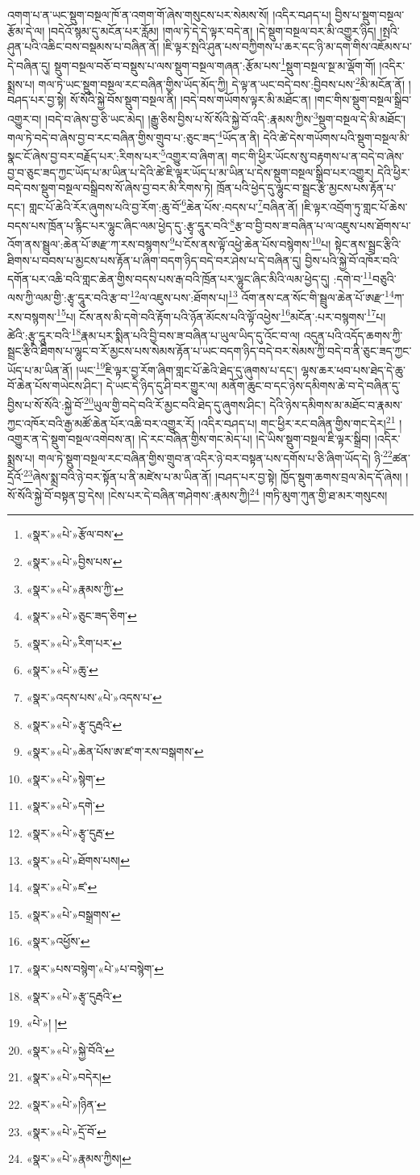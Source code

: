 འགག་པ་ན་ཡང་སྡུག་བསྔལ་ཁོ་ན་འགག་གོ་ཞེས་གསུངས་པར་སེམས་སོ། །འདིར་བཤད་པ། བྱིས་པ་སྡུག་བསྔལ་རྩོམ་དེ་ལ། །བདེའོ་སྙམ་དུ་མངོན་པར་རློམ། །གལ་ཏེ་དེ་དེ་ལྟར་བདེ་ན། །དེ་སྡུག་བསྔལ་བར་མི་འགྱུར་ཉིད། །སྤའི་ཤུན་པའི་འཆིང་བས་བསྡམས་པ་བཞིན་ནོ། །ཇི་ལྟར་སྤའི་ཤུན་པས་བཀྱིགས་པ་ཆར་དང་ཉི་མ་དག་གིས་འཇོམས་པ་དེ་བཞིན་དུ། སྡུག་བསྔལ་བཅོ་བ་བསྡུས་པ་ལས་སྡུག་བསྔལ་གཞན་:རྩོམ་པས་\footnote{«སྣར་»«པེ་»རྩོལ་བས་}སྡུག་བསྔལ་སྔ་མ་ལྡོག་གོ། །འདིར་སྨྲས་པ། གལ་ཏེ་ཡང་སྡུག་བསྔལ་རང་བཞིན་གྱིས་ཡོད་མོད་ཀྱི། དེ་ལྟ་ན་ཡང་བདེ་བས་:བྱིབས་པས་\footnote{«སྣར་»«པེ་»བྱིས་པས་}མི་མངོན་ནོ། །བཤད་པར་བྱ་སྟེ། སོ་སོའི་སྐྱེ་བོས་སྡུག་བསྔལ་ནི། །བདེ་བས་གཡོགས་ལྟར་མི་མཐོང་ན། །གང་གིས་སྡུག་བསྔལ་སྒྲིབ་འགྱུར་བ། །བདེ་བ་ཞེས་བྱ་ཅི་ཡང་མེད། །རྒྱུ་ཅིས་བྱིས་པ་སོ་སོའི་སྐྱེ་བོ་འདི་:རྣམས་ཀྱིས་\footnote{«སྣར་»«པེ་»རྣམས་ཀྱི་}སྡུག་བསྔལ་དེ་མི་མཐོང་། གལ་ཏེ་བདེ་བ་ཞེས་བྱ་བ་རང་བཞིན་གྱིས་གྲུབ་པ་:ཅུང་ཟད་\footnote{«སྣར་»«པེ་»ཅུང་ཟད་ཅིག་}ཡོད་ན་ནི། དེའི་ཚེ་དེས་གཡོགས་པའི་སྡུག་བསྔལ་མི་སྣང་ངོ་ཞེས་བྱ་བར་བརྗོད་པར་:རིགས་པར་\footnote{«སྣར་»«པེ་»རིག་པར་}འགྱུར་བ་ཞིག་ན། གང་གི་ཕྱིར་ཡོངས་སུ་བརྟགས་པ་ན་བདེ་བ་ཞེས་བྱ་བ་ཅུང་ཟད་ཀྱང་ཡོད་པ་མ་ཡིན་པ་དེའི་ཚེ་ཇི་ལྟར་ཡོད་པ་མ་ཡིན་པ་དེས་སྡུག་བསྔལ་སྒྲིབ་པར་འགྱུར། དེའི་ཕྱིར་བདེ་བས་སྡུག་བསྔལ་བསྒྲིབས་སོ་ཞེས་བྱ་བར་མི་རིགས་ཏེ། ཁྲོན་པའི་ཕྱེད་དུ་ལྷུང་བ་སྦྲང་རྩི་མྱངས་པས་རྟོན་པ་དང་། གླང་པོ་ཆེའི་རོར་ཞུགས་པའི་བྱ་རོག་:ཆུ་བོ་\footnote{«སྣར་»«པེ་»ཆུ་}ཆེན་པོས་:བདས་པ་\footnote{«སྣར་»འདས་པས་«པེ་»འདས་པ་}བཞིན་ནོ། །ཇི་ལྟར་འབྲོག་ཏུ་གླང་པོ་ཆེས་བདས་པས་ཁྲོན་པ་རྙིང་པར་ལྷུང་ཞིང་ལམ་ཕྱེད་དུ་:རྩྭ་དཱུར་བའི་\footnote{«སྣར་»«པེ་»རྩྭ་དུརྦའི་}རྩ་བ་བྱི་བས་ཟ་བཞིན་པ་ལ་འཇུས་པས་ཐོགས་པ་འོག་ནས་སྦྲུལ་:ཆེན་པོ་ཨརྫ་ཀ་རས་བསྙགས་\footnote{«སྣར་»«པེ་»ཆེན་པོས་ཨ་ཛ་ག་རས་བསྒགས་}པ་ངོས་ནས་ལྟོ་འཕྱེ་ཆེན་པོས་བསྙེགས་\footnote{«སྣར་»«པེ་»སྙེག་}པ། སྟེང་ནས་སྦྲང་རྩིའི་ཐིགས་པ་བབས་པ་མྱངས་པས་རྟོན་པ་ཞིག་བདག་ཉིད་བདེ་བར་ཤེས་པ་དེ་བཞིན་དུ། བྱིས་པའི་སྐྱེ་བོ་འཁོར་བའི་དགོན་པར་འཆི་བའི་གླང་ཆེན་གྱིས་བདས་པས་རྒ་བའི་ཁྲོན་པར་ལྷུང་ཞིང་མིའི་ལམ་ཕྱེད་དུ། :དགེ་བ་\footnote{«སྣར་»«པེ་»དགེ་}བཅུའི་ལས་ཀྱི་ལམ་གྱི་:རྩྭ་དཱུར་བའི་རྩ་བ་\footnote{«སྣར་»«པེ་»རྩྭ་དུརྦ་}ལ་འཇུས་པས་:ཐོགས་པ།\footnote{«སྣར་»«པེ་»ཐོགས་པས།} འོག་ནས་ངན་སོང་གི་སྦྲུལ་ཆེན་པོ་ཨརྫ་\footnote{«སྣར་»«པེ་»ཛ་}ཀ་རས་བསྙགས་\footnote{«སྣར་»«པེ་»བསྒྲགས་}པ། ངོས་ནས་མི་དགེ་བའི་རྟོག་པའི་ཉོན་མོངས་པའི་ལྟོ་འཕྱེས་\footnote{«སྣར་»འཕྱོས་}མངོན་:པར་བསྙགས་\footnote{«སྣར་»པས་བསྙེག་«པེ་»པ་བསྙེག་}པ། ཚེའི་:རྩྭ་དཱུར་བའི་\footnote{«སྣར་»«པེ་»རྩྭ་དུརྦའི་}རྣམ་པར་སྨིན་པའི་བྱི་བས་ཟ་བཞིན་པ་ཡུལ་ཡིད་དུ་འོང་བ་ལ། འདུན་པའི་འདོད་ཆགས་ཀྱི་སྦྲང་རྩིའི་ཐིགས་པ་ལྷུང་བ་རོ་མྱངས་པས་སེམས་རྟོན་པ་ཡང་བདག་ཉིད་བདེ་བར་སེམས་ཀྱི་བདེ་བ་ནི་ཅུང་ཟད་ཀྱང་ཡོད་པ་མ་ཡིན་ནོ། །ཡང་\footnote{«པེ་»། །}ཇི་ལྟར་བྱ་རོག་ཞིག་གླང་པོ་ཆེའི་ཐེད་དུ་ཞུགས་པ་དང་། ལྷས་ཆར་ཕབ་པས་ཐེད་དེ་ཆུ་བོ་ཆེན་པོས་གཡེངས་ཤིང་། དེ་ཡང་དེ་ཉིད་དུ་ཤི་བར་གྱུར་ལ། མནོག་ཆུང་བ་དང་ཉེས་དམིགས་ཆེ་བ་དེ་བཞིན་དུ་བྱིས་པ་སོ་སོའི་:སྐྱེ་བོ་\footnote{«སྣར་»«པེ་»སྐྱེ་བོའི་}ཡུལ་གྱི་བདེ་བའི་རོ་མྱང་བའི་ཐེད་དུ་ཞུགས་ཤིང་། དེའི་ཉེས་དམིགས་མ་མཐོང་བ་རྣམས་ཀྱང་འཁོར་བའི་རྒྱ་མཚོ་ཆེན་པོར་འཆི་བར་འགྱུར་རོ། །འདིར་བཤད་པ། གང་ཕྱིར་རང་བཞིན་གྱིས་གང་དེར།\footnote{«སྣར་»«པེ་»བདེར།} །འགྱུར་ན་དེ་སྡུག་བསྔལ་འགེབས་ན། །དེ་རང་བཞིན་གྱིས་གང་མེད་པ། །དེ་ཡིས་སྡུག་བསྔལ་ཇི་ལྟར་སྒྲིབ། །འདིར་སྨྲས་པ། གལ་ཏེ་སྡུག་བསྔལ་རང་བཞིན་གྱིས་གྲུབ་ན་འདིར་ཉེ་བར་བསྟན་པས་དགོས་པ་ཅི་ཞིག་ཡོད་དེ། ཉི་\footnote{«སྣར་»«པེ་»།ཉིན་}ཚན་དྲོའོ་\footnote{«སྣར་»«པེ་»དྲོ་བོ་}ཞེས་སྨྲ་བའི་ཉེ་བར་སྟོན་པ་ནི་མཛེས་པ་མ་ཡིན་ནོ། །བཤད་པར་བྱ་སྟེ། ཁྱོད་སྡུག་ཆགས་བྲལ་མེད་དོ་ཞེས། །སོ་སོའི་སྐྱེ་བོ་བསྟན་བྱ་དེས། །ངེས་པར་དེ་བཞིན་གཤེགས་:རྣམས་ཀྱི།\footnote{«སྣར་»«པེ་»རྣམས་ཀྱིས།} །གཏི་མུག་ཀུན་གྱི་ཐ་མར་གསུངས། 